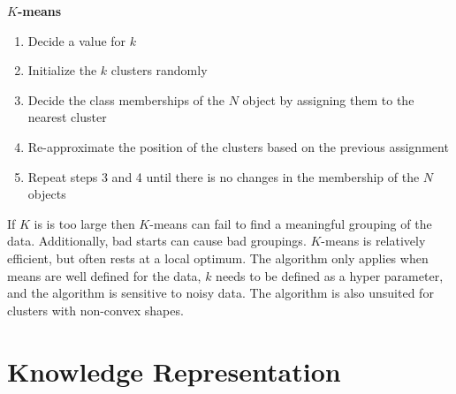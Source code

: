 \documentclass{chezarticle}
\begin{document}
\begin{algorithm}
\textbf{$K$-means}
\begin{enumerate}
    \item Decide a value for $k$
    \item Initialize the $k$ clusters randomly
    \item Decide the class memberships of the $N$ object by assigning them to the nearest cluster
    \item Re-approximate the position of the clusters based on the previous assignment
    \item Repeat steps 3 and 4 until there is no changes in the membership of the $N$ objects
\end{enumerate}
\end{algorithm}
If $K$ is is too large then $K$-means can fail to find a meaningful grouping of the data. Additionally, bad starts can cause bad groupings. $K$-means is relatively efficient, but often rests at a local optimum. The algorithm only applies when means are well defined for the data, $k$ needs to be defined as a hyper parameter, and the algorithm is sensitive to noisy data. The algorithm is also unsuited for clusters with non-convex shapes.\\

\section{Knowledge Representation}
\end{document}
